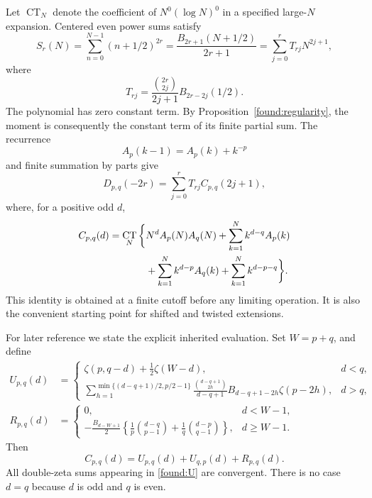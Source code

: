 \documentclass[11pt]{article}
\theoremstyle{definition}
\theoremstyle{remark}
\numberwithin{equation}{section}
\DeclareMathOperator{\CT}{CT}
\begin{document}
Let $\CT_N$ denote the coefficient of $N^0(\log N)^0$ in a
specified large-$N$ expansion. Centered even power sums satisfy
\begin{equation}\label{found:power-sum}
 S_r(N)=\sum_{n=0}^{N-1}(n+1/2)^{2r}
 =\frac{B_{2r+1}(N+1/2)}{2r+1}
 =\sum_{j=0}^r T_{rj}N^{2j+1},
\end{equation}
where
\[
 T_{rj}=\frac{\binom{2r}{2j}}{2j+1}B_{2r-2j}(1/2).
\]
The polynomial has zero constant term. By
Proposition~\ref{found:regularity}, the moment is consequently the
constant term of its finite partial sum. The recurrence
\[
                         A_p(k-1)=A_p(k)+k^{-p}
\]
and finite summation by parts give
\begin{equation}\label{found:blocks}
 D_{p,q}(-2r)=\sum_{j=0}^r T_{rj}C_{p,q}(2j+1),
\end{equation}
where, for a positive odd $d$,
\begin{align}\label{found:block-CT}
 C_{p,q}(d)=\CT_N\bigg\{&N^dA_p(N)A_q(N)
       +\sum_{k=1}^N k^{d-q}A_p(k)\notag\\
       &+\sum_{k=1}^N k^{d-p}A_q(k)
       +\sum_{k=1}^N k^{d-p-q}\bigg\}.
\end{align}
This identity is obtained at a finite cutoff before any limiting
operation. It is also the convenient starting point for shifted and
twisted extensions.

For later reference we state the explicit inherited evaluation.
Set $W=p+q$, and define
\begin{align}
 U_{p,q}(d)&=
 \begin{cases}
 \zeta(p,q-d)+\tfrac12\zeta(W-d),&d<q,\\[3pt]
 \displaystyle\sum_{h=1}^{\min\{(d-q+1)/2,p/2-1\}}
 \frac{\binom{d-q+1}{2h}}{d-q+1}
 B_{d-q+1-2h}\zeta(p-2h),&d>q,
 \end{cases}\label{found:U}\\
 R_{p,q}(d)&=
 \begin{cases}
 0,&d<W-1,\\[3pt]
 \displaystyle-\frac{B_{d-W+1}}2
 \left\{\frac1p\binom{d-q}{p-1}
       +\frac1q\binom{d-p}{q-1}\right\},&d\ge W-1.
 \end{cases}\label{found:R}
\end{align}
Then
\begin{equation}\label{found:C-evaluation}
 C_{p,q}(d)=U_{p,q}(d)+U_{q,p}(d)+R_{p,q}(d).
\end{equation}
All double-zeta sums appearing in \eqref{found:U} are convergent.
There is no case $d=q$ because $d$ is odd and $q$ is even.
\end{document}

